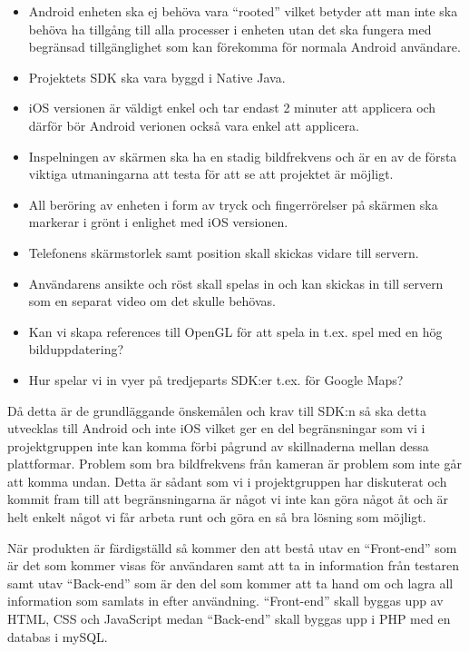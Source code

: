\begin{itemize}
	\item Android enheten ska ej behöva vara “rooted” vilket betyder att man inte ska behöva ha tillgång till alla processer i enheten utan det ska fungera med begränsad tillgänglighet som kan 	förekomma för normala Android användare.
	\item Projektets SDK ska vara byggd i Native Java.
	\item iOS versionen är väldigt enkel och tar endast 2 minuter att applicera och därför bör Android verionen också vara enkel att applicera.
	\item Inspelningen av skärmen ska ha en stadig bildfrekvens och är en av de första viktiga utmaningarna att testa för att se att projektet är möjligt.
	\item All beröring av enheten i form av tryck och fingerrörelser på skärmen ska markerar i grönt i enlighet med iOS versionen.
	\item Telefonens skärmstorlek samt position skall skickas vidare till servern.
	\item Användarens ansikte och röst skall spelas in och kan skickas in till servern som en separat video om det skulle behövas.
	\item Kan vi skapa references till OpenGL för att spela in t.ex. spel med en hög bilduppdatering?
	\item Hur spelar vi in vyer på tredjeparts SDK:er t.ex. för Google Maps?
\end{itemize}


Då detta är de grundläggande önskemålen och krav till SDK:n så ska detta utvecklas till Android och inte iOS vilket ger en del begränsningar som vi i projektgruppen inte kan komma förbi pågrund av skillnaderna mellan dessa plattformar. Problem som bra bildfrekvens från kameran är problem som inte går att komma undan. Detta är sådant som vi i projektgruppen har diskuterat och kommit fram till att begränsningarna är något vi inte kan göra något åt och är helt enkelt något vi får arbeta runt och göra en så bra lösning som möjligt.


När produkten är färdigställd så kommer den att bestå utav en “Front-end” som är det som kommer visas för användaren samt att ta in information från testaren samt utav “Back-end” som är den del som kommer att ta hand om och lagra all information som samlats in efter användning. “Front-end” skall byggas upp av HTML, CSS och JavaScript medan “Back-end” skall byggas upp i PHP med en databas i mySQL.

